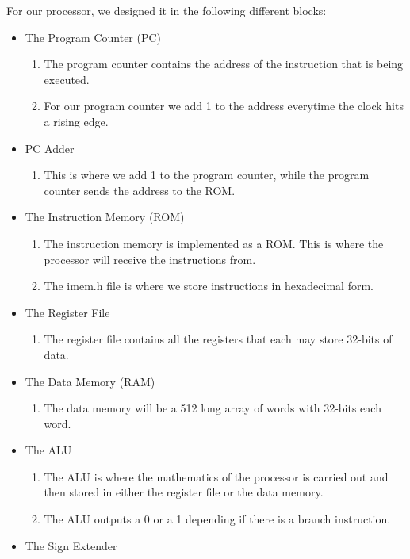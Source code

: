 \documentclass[paper=letter, fontsize=11pt]{scrartcl} %
\numberwithin{equation}{section}
\numberwithin{figure}{section}
\numberwithin{table}{section}
\begin{document}
\begin{center}
For our processor, we designed it in the following different blocks:
\end{center}
\begin{itemize}
	\item The Program Counter (PC)
	\begin{enumerate}
		\item The program counter contains the address of the instruction that is being executed.
		\item For our program counter we add 1 to the address everytime the clock hits a rising edge.
	\end{enumerate}
	\item PC Adder
	\begin{enumerate}
		\item This is where we add 1 to the program counter, while the program counter sends the address to the ROM.
	\end{enumerate}
	\item The Instruction Memory (ROM)
	\begin{enumerate}
		\item The instruction memory is implemented as a ROM. This is where the processor will receive the instructions from.
		\item The imem.h file is where we store instructions in hexadecimal form. 
	\end{enumerate}
	\item The Register File
	\begin{enumerate}
		\item The register file contains all the registers that each may store 32-bits of data.
	\end{enumerate}
	\item The Data Memory (RAM)
	\begin{enumerate}
		\item The data memory will be a 512 long array of words with 32-bits each word.
	\end{enumerate}
	\item The ALU
	\begin{enumerate}
		\item The ALU is where the mathematics of the processor is carried out and then stored in either the register file or the data memory.
		\item The ALU outputs a 0 or a 1 depending if there is a branch instruction.
	\end{enumerate}
	\item The Sign Extender

\end{itemize}
\end{document}
